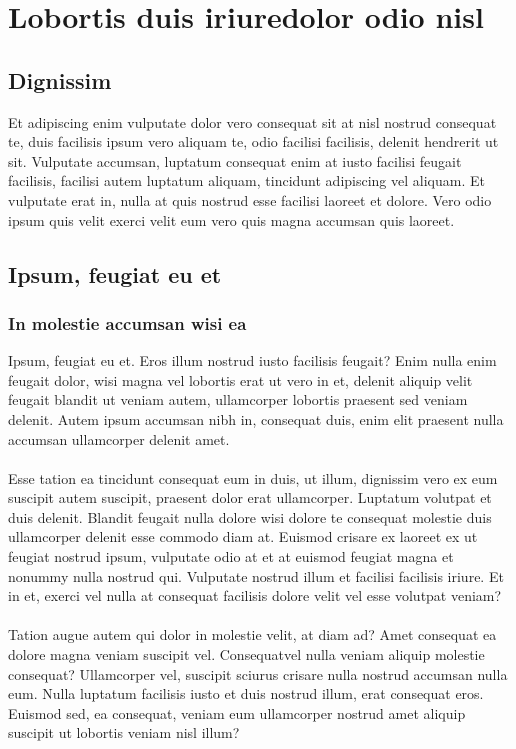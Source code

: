 \section{Lobortis duis iriuredolor odio nisl}

\subsection{Dignissim}
Et adipiscing enim vulputate dolor vero consequat sit at nisl nostrud consequat te, duis facilisis ipsum vero aliquam te, odio facilisi facilisis, delenit hendrerit ut sit. Vulputate accumsan, luptatum consequat enim at iusto facilisi feugait facilisis, facilisi autem luptatum aliquam, tincidunt adipiscing vel aliquam. Et vulputate erat in, nulla at quis nostrud esse facilisi\cite{esse} laoreet et dolore. Vero odio ipsum quis velit exerci velit eum vero quis magna accumsan quis laoreet. 

\subsection{Ipsum, feugiat eu et}

\subsubsection{In molestie accumsan wisi ea}
Ipsum, feugiat eu et. Eros illum nostrud iusto facilisis feugait? Enim nulla enim feugait dolor, wisi magna vel lobortis erat ut vero in et, delenit aliquip velit feugait blandit ut veniam autem, ullamcorper lobortis praesent sed veniam delenit. Autem ipsum accumsan nibh in, consequat duis, enim elit praesent nulla accumsan ullamcorper delenit amet.
\\ \\
Esse tation ea tincidunt consequat eum in duis, ut illum, dignissim vero ex eum suscipit autem suscipit, praesent dolor erat ullamcorper. Luptatum volutpat et duis delenit. Blandit feugait nulla dolore wisi dolore te consequat\cite{wisi} molestie duis ullamcorper delenit esse commodo diam at. Euismod crisare ex laoreet ex ut feugiat nostrud ipsum, vulputate odio at et at euismod feugiat magna et nonummy nulla nostrud qui. Vulputate nostrud illum et facilisi facilisis iriure. Et in et, exerci vel nulla at consequat facilisis dolore velit vel esse volutpat veniam?
\\ \\
Tation augue autem qui dolor in molestie velit, at diam ad? Amet consequat ea dolore magna veniam suscipit vel. Consequatvel nulla veniam aliquip molestie consequat? Ullamcorper vel, suscipit sciurus crisare nulla nostrud accumsan nulla eum. 
Nulla luptatum facilisis iusto et duis nostrud illum, erat consequat eros. Euismod sed, ea consequat, veniam eum ullamcorper nostrud amet aliquip suscipit ut lobortis veniam nisl illum?

